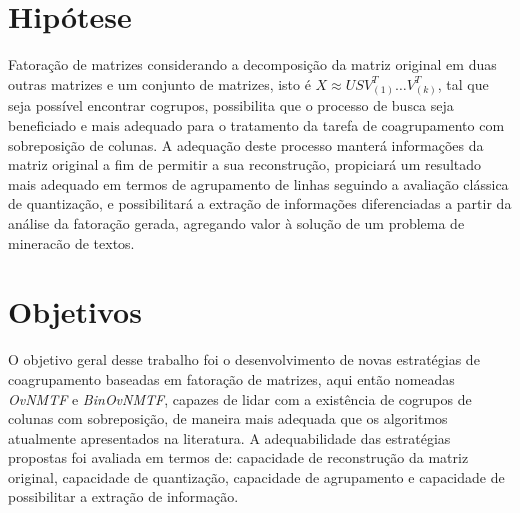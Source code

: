 \documentclass[
    12pt,                %
    oneside,            %
    a4paper,            %
    english,            %
    brazil                %
    ]{abntex2ppgsi}
\begin{document}



\section{Hipótese}

Fatoração de matrizes considerando a decomposição da matriz original em duas outras matrizes e um conjunto de matrizes, isto é $X \approx USV_{(1)}^T \dots V_{(k)}^T$, tal que seja possível encontrar cogrupos, possibilita que o processo de busca seja beneficiado e mais adequado para o tratamento da tarefa de coagrupamento com sobreposição de colunas.
A adequação deste processo manterá informações da matriz original a fim de permitir a sua reconstrução, propiciará um resultado mais adequado em termos de agrupamento de linhas seguindo a avaliação clássica de quantização, e possibilitará a extração de informações diferenciadas a partir da análise da fatoração gerada, agregando valor à solução de um problema de mineracão de textos.


\section{Objetivos}

O objetivo geral desse trabalho foi o desenvolvimento de novas estratégias de coagrupamento baseadas em fatoração de matrizes, aqui então nomeadas \textit{OvNMTF} e \textit{BinOvNMTF}, capazes de lidar com a existência de cogrupos de colunas com sobreposição, de maneira mais adequada que os algoritmos atualmente apresentados na literatura.
A adequabilidade das estratégias propostas foi avaliada em termos de: capacidade de reconstrução da matriz original, capacidade de quantização, capacidade de agrupamento e capacidade de possibilitar a extração de informação.
\end{document}
